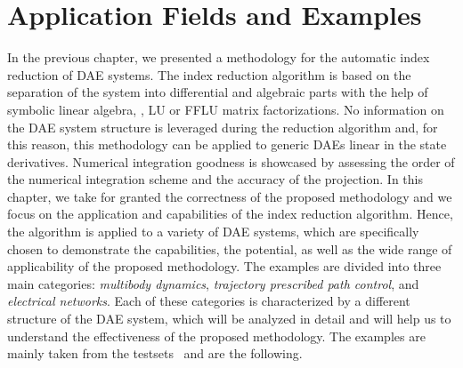 
\chapter{Application Fields and Examples}
\label{chap4:applications}

In the previous chapter, we presented a methodology for the automatic index reduction of \ac{DAE} systems. The index reduction algorithm is based on the separation of the system into differential and algebraic parts with the help of symbolic linear algebra, \ie{}, \ac{LU} or \ac{FFLU} matrix factorizations. No information on the \ac{DAE} system structure is leveraged during the reduction algorithm and, for this reason, this methodology can be applied to generic \acp{DAE} linear in the state derivatives. Numerical integration goodness is showcased by assessing the order of the numerical integration scheme and the accuracy of the projection. In this chapter, we take for granted the correctness of the proposed methodology and we focus on the application and capabilities of the index reduction algorithm. Hence, the algorithm is applied to a variety of \ac{DAE} systems, which are specifically chosen to demonstrate the capabilities, the potential, as well as the wide range of applicability of the proposed methodology. The examples are divided into three main categories: \emph{multibody dynamics}, \emph{trajectory prescribed path control}, and \emph{electrical networks}. Each of these categories is characterized by a different structure of the \ac{DAE} system, which will be analyzed in detail and will help us to understand the effectiveness of the proposed methodology. The examples are mainly taken from the testsets~\cite{lioen1998test, mazzia2003test, mazzia2008test, mazzia2012test} and are the following.
%
